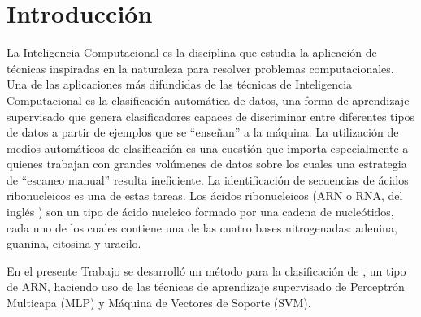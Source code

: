 %
%
%
\chapter{Introducción}
\setcounter{page}{1}
%
La Inteligencia Computacional es la disciplina que estudia la
aplicación de técnicas inspiradas en la naturaleza para resolver
problemas computacionales.
Una de las aplicaciones más difundidas de las técnicas de Inteligencia
Computacional es la clasificación automática de datos, una forma de
aprendizaje supervisado que genera clasificadores capaces de
discriminar entre diferentes tipos de datos a partir de ejemplos que
se ``enseñan'' a la máquina.
La utilización de medios automáticos de clasificación es una cuestión
que importa especialmente a quienes trabajan con grandes volúmenes de
datos sobre los cuales una estrategia de ``escaneo manual'' resulta
ineficiente.
La identificación de secuencias de ácidos ribonucleicos es una de
estas tareas.
Los ácidos ribonucleicos (ARN o RNA, del inglés )
son un tipo de ácido nucleico formado por una cadena de nucleótidos,
cada uno de los cuales contiene una de las cuatro bases nitrogenadas:
adenina, guanina, citosina y uracilo.


En el presente Trabajo se desarrolló un método para la clasificación
de , un tipo de ARN, haciendo uso de las técnicas de
aprendizaje supervisado de Perceptrón Multicapa (MLP) y Máquina de
Vectores de Soporte (SVM).
